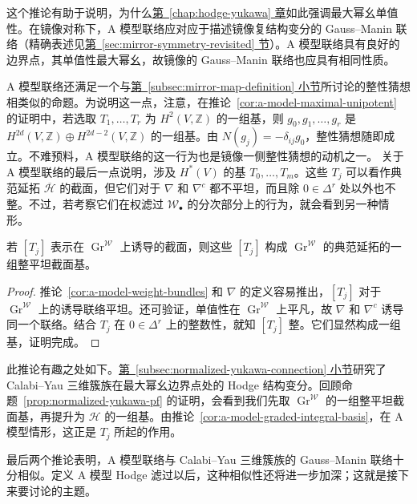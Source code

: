 这个推论有助于说明，为什么\hyperref[chap:hodge-yukawa]{第~\ref*{chap:hodge-yukawa} 章}如此强调最大幂幺单值性。在镜像对称下，A 模型联络应对应于描述镜像复结构变分的 Gauss--Manin 联络（精确表述见\hyperref[sec:mirror-symmetry-revisited]{第~\ref*{sec:mirror-symmetry-revisited} 节}）。A 模型联络具有良好的边界点，其单值性最大幂幺，故镜像的 Gauss--Manin 联络也应具有相同性质。

A 模型联络还满足一个与\hyperref[subsec:mirror-map-definition]{第~\ref*{subsec:mirror-map-definition} 小节}所讨论的整性猜想相类似的命题。为说明这一点，注意，在推论~\ref{cor:a-model-maximal-unipotent} 的证明中，若选取 $T_1,\ldots,T_r$ 为 $H^2(V,\mathbb Z)$ 的一组基，则 $g_0,g_1,\ldots,g_r$ 是 $H^{2d}(V,\mathbb Z)\oplus H^{2d-2}(V,\mathbb Z)$ 的一组基。由 $N(g_j)=-\delta_{ij}g_0$，整性猜想随即成立。不难预料，A 模型联络的这一行为也是镜像一侧整性猜想的动机之一。
关于 A 模型联络的最后一点说明，涉及 $H^*(V)$ 的基 $T_0,\ldots,T_m$。这些 $T_j$ 可以看作典范延拓 $\overline{\mathcal H}$ 的截面，但它们对于 $\nabla$ 和 $\nabla^c$ 都不平坦，而且除 $0\in\Delta^r$ 处以外也不整。不过，若考察它们在权滤过 $\mathcal W_\bullet$ 的分次部分上的行为，就会看到另一种情形。
\begin{corollary}\label{cor:a-model-graded-integral-basis}
若 $[T_j]$ 表示在 $\operatorname{Gr}^{\mathcal W}$ 上诱导的截面，则这些 $[T_j]$ 构成 $\operatorname{Gr}^{\mathcal W}$ 的典范延拓的一组整平坦截面基。
\end{corollary}
\begin{proof}
推论~\ref{cor:a-model-weight-bundles} 和 $\nabla$ 的定义容易推出，$[T_j]$ 对于 $\operatorname{Gr}^{\mathcal W}$ 上的诱导联络平坦。还可验证，单值性在 $\operatorname{Gr}^{\mathcal W}$ 上平凡，故 $\nabla$ 和 $\nabla^c$ 诱导同一个联络。结合 $T_j$ 在 $0\in\Delta^r$ 上的整数性，就知 $[T_j]$ 整。它们显然构成一组基，证明完成。
\end{proof}
此推论有趣之处如下。\hyperref[subsec:normalized-yukawa-connection]{第~\ref*{subsec:normalized-yukawa-connection} 小节}研究了 Calabi--Yau 三维簇族在最大幂幺边界点处的 Hodge 结构变分。回顾命题~\ref{prop:normalized-yukawa-pf} 的证明，会看到我们先取 $\operatorname{Gr}^{\mathcal W}$ 的一组整平坦截面基，再提升为 $\mathcal H$ 的一组基。由推论~\ref{cor:a-model-graded-integral-basis}，在 A 模型情形，这正是 $T_j$ 所起的作用。

最后两个推论表明，A 模型联络与 Calabi--Yau 三维簇族的 Gauss--Manin 联络十分相似。定义 A 模型 Hodge 滤过以后，这种相似性还将进一步加深；这就是接下来要讨论的主题。

